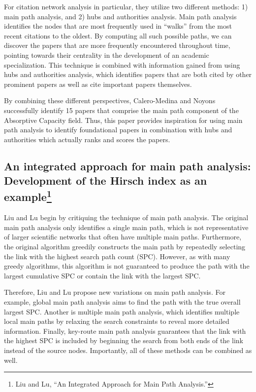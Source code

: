 \documentclass[lettepaper,]{article}
\begin{document}
For citation network analysis in particular, they utilize two different
methods: 1) main path analysis, and 2) hubs and authorities analysis.
Main path analysis identifies the nodes that are most frequently used in
``walks'' from the most recent citations to the oldest. By computing all
such possible paths, we can discover the papers that are more frequently
encountered throughout time, pointing towards their centrality in the
development of an academic specialization. This technique is combined
with information gained from using hubs and authorities analysis, which
identifies papers that are both cited by other prominent papers as well
as cite important papers themselves.

By combining these different perspectives, Calero-Medina and Noyons
successfully identify 15 papers that comprise the main path component of
the Absorptive Capacity field. Thus, this paper provides inspiration for
using main path analysis to identify foundational papers in combination
with hubs and authorities which actually ranks and scores the papers.

\hypertarget{an-integrated-approach-for-main-path-analysis-development-of-the-hirsch-index-as-an-example-liuintegratedapproachmain2012}{%
\subsection[An integrated approach for main path analysis: Development
of the Hirsch index as an example]{\texorpdfstring{An integrated
approach for main path analysis: Development of the Hirsch index as an
example\footnote{Liu and Lu, ``An Integrated Approach for Main Path
  Analysis.''}}{An integrated approach for main path analysis: Development of the Hirsch index as an example}}\label{an-integrated-approach-for-main-path-analysis-development-of-the-hirsch-index-as-an-example-liuintegratedapproachmain2012}}

Liu and Lu begin by critiquing the technique of main path analysis. The
original main path analysis only identifies a single main path, which is
not representative of larger scientific networks that often have
multiple main paths. Furthermore, the original algorithm greedily
constructs the main path by repeatedly selecting the link with the
highest search path count (SPC). However, as with many greedy
algorithms, this algorithm is not guaranteed to produce the path with
the largest cumulative SPC or contain the link with the largest SPC.

Therefore, Liu and Lu propose new variations on main path analysis. For
example, global main path analysis aims to find the path with the true
overall largest SPC. Another is multiple main path analysis, which
identifies multiple local main paths by relaxing the search constraints
to reveal more detailed information. Finally, key-route main path
analysis guarantees that the link with the highest SPC is included by
beginning the search from both ends of the link instead of the source
nodes. Importantly, all of these methods can be combined as well.
\end{document}
